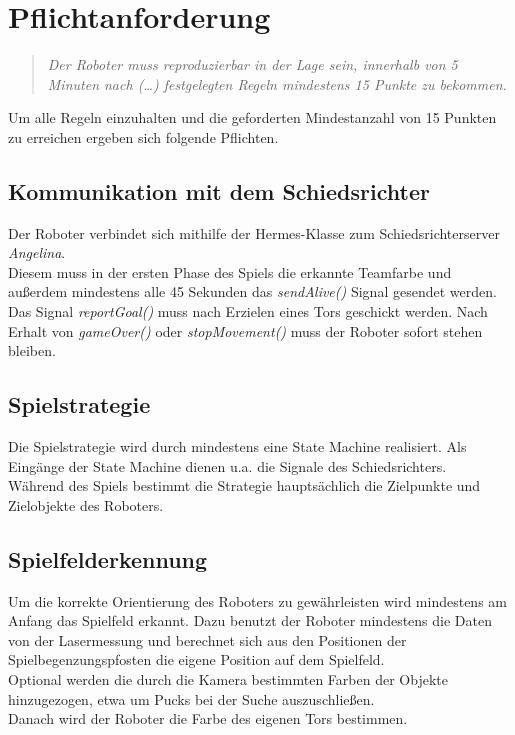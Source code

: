 \documentclass[12pt]{article}
\begin{document}
\section{Pflichtanforderung}
\begin{quote}
	\textit{Der Roboter muss reproduzierbar in der Lage sein, innerhalb von 5 Minuten nach (\ldots) festgelegten Regeln mindestens 15 Punkte zu bekommen.}
\end{quote}

Um alle Regeln einzuhalten und die geforderten Mindestanzahl von 15 Punkten zu erreichen ergeben sich folgende Pflichten.

\subsection{Kommunikation mit dem Schiedsrichter}
Der Roboter verbindet sich mithilfe der Hermes-Klasse zum Schiedsrichterserver \textit{Angelina}. \\
Diesem muss in der ersten Phase des Spiels die erkannte Teamfarbe und außerdem mindestens alle 45 Sekunden das \textit{sendAlive()} Signal gesendet werden. Das Signal \textit{reportGoal()} muss nach Erzielen eines Tors geschickt werden. Nach Erhalt von \textit{gameOver()} oder \textit{stopMovement()} muss der Roboter sofort stehen bleiben.

\subsection{Spielstrategie}
Die Spielstrategie wird durch mindestens eine State Machine realisiert. Als Eingänge der State Machine dienen u.a. die Signale des Schiedsrichters.\\
Während des Spiels bestimmt die Strategie hauptsächlich die Zielpunkte und Ziel\-objekte des Roboters.

\subsection{Spielfelderkennung}
Um die korrekte Orientierung des Roboters zu gewährleisten wird mindestens am Anfang das Spielfeld erkannt. Dazu benutzt der Roboter mindestens die Daten von der Lasermessung und berechnet sich aus den Positionen der Spielbegenzungspfosten die eigene Position auf dem Spielfeld.\\
Optional werden die durch die Kamera bestimmten Farben der Objekte hinzugezogen, etwa um Pucks bei der Suche auszuschließen.\\
Danach wird der Roboter die Farbe des eigenen Tors bestimmen.
\end{document}
